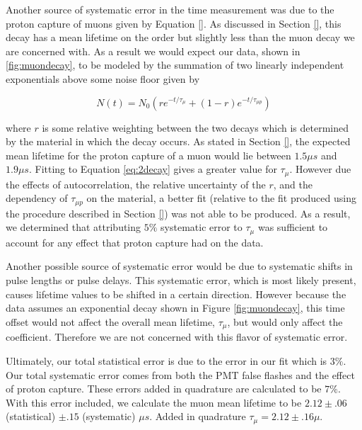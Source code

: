 Another source of systematic error in the time measurement was due to the proton capture of muons given by Equation \eqref{}.  As discussed in Section \ref{}, this decay has a mean lifetime on the order but slightly less than the muon decay we are concerned with.  As a result we would expect our data, shown in \ref{fig:muondecay}, to be modeled by the summation of two linearly independent exponentials above some noise floor given by

\begin{center}
\begin{equation}
\label{eq:2decay}
N(t)=N_{0}(r e^{-t/\tau_{\mu}}+(1-r)e^{-t/\tau_{\mu p}})
\end{equation}
\end{center}

where $r$ is some relative weighting between the two decays which is determined by the material in which the decay occurs.  As stated in Section \ref{}, the expected mean lifetime for the proton capture of a muon would lie between $1.5 \mu s$ and $1.9 \mu s$.  Fitting to Equation \eqref{eq:2decay} gives a greater value for $\tau_{\mu}$.  However due the effects of autocorrelation, the relative uncertainty of the $r$, and the dependency of $\tau_{\mu p}$ on the material, a better fit (relative to the fit produced using the procedure described in Section \ref{}) was not able to be produced.  As a result, we determined that attributing $5\%$ systematic error to $\tau_{\mu}$ was sufficient to account for any effect that proton capture had on the data. 

Another possible source of systematic error would be due to systematic shifts in pulse lengths or pulse delays.  This systematic error, which is most likely present, causes lifetime values to be shifted in a certain direction.  However because the data assumes an exponential decay shown in Figure \ref{fig:muondecay}, this time offset would not affect the overall mean lifetime, $\tau_{\mu}$, but would only affect the coefficient.  Therefore we are not concerned with this flavor of systematic error.

Ultimately, our total statistical error is due to the error in our fit which is $3\%$.  Our total systematic error comes from both the PMT false flashes and the effect of proton capture.  These errors added in quadrature are calculated to be $7\%$.  With this error included, we calculate the muon mean lifetime to be $2.12\pm.06$ (statistical) $\pm.15$ (systematic) $\mu s$.  Added in quadrature $\tau_{\mu}=2.12\pm.16\mu$.
